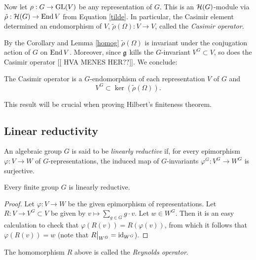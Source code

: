 \documentclass[11pt, english]{article}
\begin{document}
Now let $\rho: G \to \operatorname{GL}(V)$ be any representation of $G$. This is an $\mathcal{H}(G)$-module via $\tilde \rho:\mathcal{H}(G) \to \operatorname{End} V$ from Equation \ref{tilde}. In particular, the Casimir element determined an endomorphism of $V$, $\tilde \rho (\Omega): V \to V$, called the \emph{Casimir operator}. 

By the Corollary and Lemma \ref{homog}  $\tilde \rho(\Omega)$ is invariant under the conjugation action of $G$ on $\operatorname{End} V$. Moreover, since $\mathfrak g$ kills the $G$-invariant $V^G \subset V$, so does the Casimir operator [[ HVA MENES HER??]]. We conclude:

\begin{corr}
\label{korrker}
The Casimir operator is a $G$-endomorphism of each representation $V$ of $G$ and 
$$
V^G \subset \ker ( \tilde \rho(\Omega)).
$$
\end{corr}

This result will be crucial when proving Hilbert's finiteness theorem.

\subsection{Linear reductivity}

\begin{defi}
An algebraic group $G$ is said to be \emph{linearly reductive} if, for every epimorphism $\varphi:V \to W$ of $G$-representations, the induced map of $G$-invariants $\varphi^G:V^G \to W^G$ is surjective.
\end{defi}

\begin{prop}
Every finite group $G$ is linearly reductive.
\end{prop}

\begin{proof}
Let $\varphi: V \to W$ be the given epimorphism of representations. Let $ R:V \to V^G \subset V$ be given by $v \mapsto \sum_{g \in G} g\cdot v$. Let $w \in W^G$. Then it is an easy calculation to check that $\varphi(R(v))=R(\varphi(v))$, from which it follows that $\varphi(R(v))=w$ (note that $\restr{R}{W^G}=\id_{W^G}$).
\end{proof}

The homomorphism $R$ above is called the \emph{Reynolds operator}.
\end{document}
